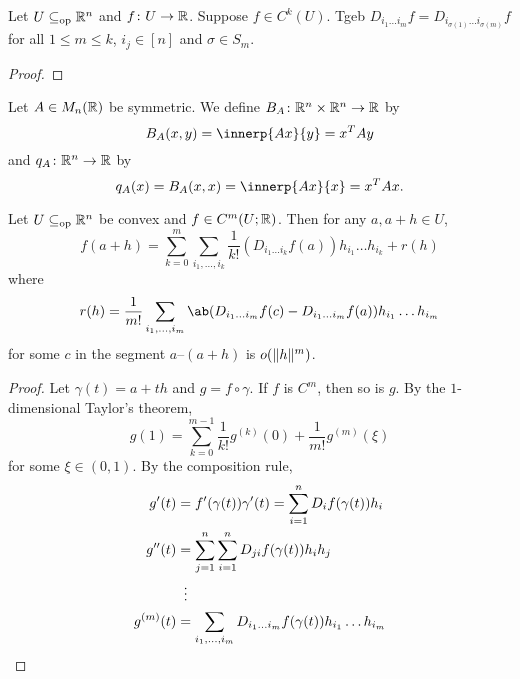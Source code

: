 
\begin{corollary}
    Let $U \subseteq_{\mathrm{op}} \mathbb{R}^n$ and $f\colon U \to \mathbb{R}$.
    Suppose $f \in C^k(U)$.
    Tgeb $D_{i_1 \dots i_m} f = D_{i_{\sigma(1)} \dots i_{\sigma(m)}} f$
    for all $1 \le m \le k$, $i_j \in [n]$ and $\sigma \in S_m$.
\end{corollary}
\begin{proof}
    \TODO[Exercise] %
\end{proof}

\begin{definition} \label{def:quadform}
    Let $A \in M_n(\mathbb{R})$ be symmetric.
    We define $B_A\colon \mathbb{R}^n \times \mathbb{R}^n \to \mathbb{R}$ by \[
        B_A(x, y) = \innerp{Ax}{y} = x^T A y
    \] and $q_A\colon \mathbb{R}^n \to \mathbb{R}$ by \[
        q_A(x) = B_A(x, x) = \innerp{Ax}{x} = x^T A x.
    \]
\end{definition}

\begin{theorem} \label{thm:taylor}
    Let $U \subseteq_{\mathrm{op}} \mathbb{R}^n$ be convex and $f \in C^m(U; \mathbb{R})$.
    Then for any $a, a + h \in U$, \[
        f(a + h) = \sum_{k=0}^m \sum_{i_1, \dots, i_k} \frac1{k!}
            (D_{i_1 \dots i_k} f(a)) h_{i_1} \dots h_{i_k}
            + r(h)
    \] where \[
        r(h) = \frac1{m!} \sum_{i_1, \dots, i_m} \ab(
                D_{i_1 \dots i_m} f(c) - D_{i_1 \dots i_m} f(a)
            ) h_{i_1} \dots h_{i_m}
    \] for some $c$ in the segment $a$--$(a + h)$ is $o(\lVert h\rVert^m)$.
\end{theorem}
\begin{proof}
    Let $\gamma(t) = a + th$ and $g = f \circ \gamma$.
    If $f$ is $C^m$, then so is $g$.
    By the $1$-dimensional Taylor's theorem, \[
        g(1) = \sum_{k=0}^{m-1} \frac1{k!} g^{(k)}(0)
            + \frac1{m!} g^{(m)}(\xi)
    \] for some $\xi \in (0, 1)$.
    By the composition rule, \begin{align*}
        g'(t) &= f'(\gamma(t)) \gamma'(t)
            = \sum_{i=1}^n D_i f(\gamma(t)) h_i \\
        g''(t) &= \sum_{j=1}^n \sum_{i=1}^n D_{ji} f(\gamma(t)) h_i h_j \\
            &\vdotswithin{=} \\
        g^{(m)}(t) &= \sum_{i_1, \dots, i_m} D_{i_1 \dots i_m} f(\gamma(t))
            h_{i_1} \dots h_{i_m} \qedhere
    \end{align*}
\end{proof}
